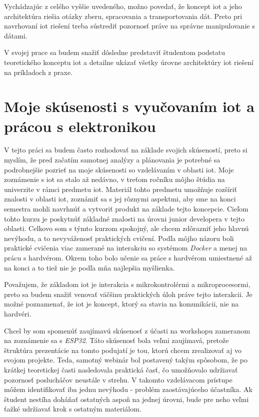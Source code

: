 Vychádzajúc z celého vyššie uvedeného, možno povedať, že koncept \gls{iot} a jeho architektúra riešia otázky zberu, spracovania a transportovania dát. Preto pri navrhovaní \gls{iot} riešení treba sústrediť pozornosť práve na správne manipulovanie s dátami.

V svojej prace sa budem snažiť dôsledne predstaviť študentom podstatu teoretického konceptu \gls{iot} a detailne ukázať všetky úrovne architektúry \gls{iot} riešení na príkladoch z praxe.


\section{Moje skúsenosti s vyučovaním \gls{iot} a prácou s elektronikou}
V tejto práci sa budem často rozhodovať na základe svojich skúseností, preto si myslím, že pred začatím samotnej analýzy a plánovania je potrebné sa podrobnejšie pozrieť na moje skúsenosti so vzdelávaním v oblasti \gls{iot}. Moje zoznámenie s \gls{iot} sa stalo až nedávno, v treťom ročníku môjho štúdia na univerzite v rámci predmetu \gls{iot}\cite{iotTuke}. Materiál tohto predmetu umožňuje rozšíriť znalosti v oblasti \gls{iot}, zoznámiť sa s jej rôznymi aspektmi, aby sme na konci semestra mohli navrhnúť a vytvoriť produkt na základe tejto koncepcie. Cieľom tohto kurzu je poskytnúť základné znalosti na úrovni junior developera v tejto oblasti. Celkovo som s týmto kurzom spokojný, ale chcem zdôrazniť jeho hlavnú nevýhodu, a to nevyváženosť praktických cvičení. Podľa môjho názoru boli praktické cvičenia viac zamerané na interakciu so systémom \textit{Docker} a menej na prácu s hardvérom. Okrem toho bolo učenie sa práce s hardvérom umiestnené až na konci a to tiež nie je podľa mňa najlepšia myšlienka.

Považujem, že základom \gls{iot} je interakcia s mikrokontrolérmi a mikroprocesormi, preto sa budem snažiť venovať väčšinu praktických úloh práve tejto interakcii. Je možné poznamenať, že \gls{iot} je koncept, ktorý sa stavia na komunikácii, nie na hardvéri.

Chcel by som spomenúť zaujímavú skúsenosť z účasti na workshopu zameranom na zoznámenie sa s \textit{ESP32}. Táto skúsenosť bola veľmi zaujímavá, pretože štruktúra prezentácie na tomto podujatí je tou, ktorú chcem zrealizovať aj vo svojom projekte. Teda, samotný webinár bol postavený takým spôsobom, že po krátkej teoretickej časti nasledovala praktická časť, čo umožňovalo udržiavať pozornosť poslucháčov neustále v strehu. V takomto vzdelávacom prístupe môžem identifikovať iba jednu nevýhodu - problém zaostávajúceho účastníka. Ak študent nestíha doháňať ostatných aspoň na jednej úrovni, bude pre neho veľmi ťažké udržiavať krok s ostatným materiálom.

